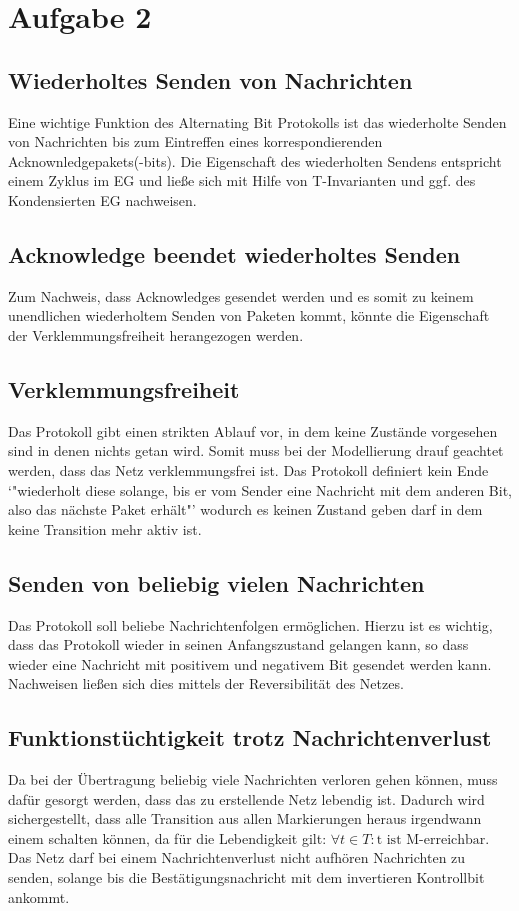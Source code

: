 \documentclass[10pt]{scrartcl}
\begin{document}
\section{Aufgabe 2}


\subsection{Wiederholtes Senden von Nachrichten}
Eine wichtige Funktion des Alternating Bit Protokolls ist das wiederholte Senden von Nachrichten bis zum Eintreffen eines korrespondierenden Acknownledgepakets(-bits).
Die Eigenschaft des wiederholten Sendens entspricht einem Zyklus im EG und ließe sich mit Hilfe von T-Invarianten und ggf. des Kondensierten EG nachweisen.

\subsection{Acknowledge beendet wiederholtes Senden}
Zum Nachweis, dass Acknowledges gesendet werden und es somit zu keinem unendlichen wiederholtem Senden von Paketen kommt, könnte die Eigenschaft der Verklemmungsfreiheit herangezogen werden.

\subsection{Verklemmungsfreiheit}
Das Protokoll gibt einen strikten Ablauf vor, in dem  keine Zustände vorgesehen sind in denen nichts getan wird. Somit muss bei der Modellierung drauf geachtet werden, dass das Netz verklemmungsfrei ist. Das Protokoll definiert kein Ende `"wiederholt diese solange, bis er vom Sender eine Nachricht mit dem anderen Bit, also das nächste Paket erhält"' wodurch es keinen Zustand geben darf in dem keine Transition mehr aktiv ist.

\subsection{Senden von beliebig vielen Nachrichten}
Das Protokoll soll beliebe Nachrichtenfolgen ermöglichen.
Hierzu ist es wichtig, dass das Protokoll wieder in seinen Anfangszustand gelangen kann, so dass wieder eine Nachricht mit positivem und negativem Bit gesendet werden kann.
Nachweisen ließen sich dies mittels der Reversibilität des Netzes.

\subsection{Funktionstüchtigkeit trotz Nachrichtenverlust}
Da bei der Übertragung beliebig viele Nachrichten verloren gehen können, muss dafür gesorgt werden, dass das zu erstellende Netz lebendig ist. Dadurch wird sichergestellt, dass alle Transition aus allen Markierungen heraus irgendwann einem schalten können, da für die Lebendigkeit gilt: $\forall t \in T : \text{t ist M-erreichbar}$. Das Netz darf bei einem Nachrichtenverlust nicht aufhören Nachrichten zu senden, solange bis die Bestätigungsnachricht mit dem invertieren Kontrollbit ankommt.
\end{document}
